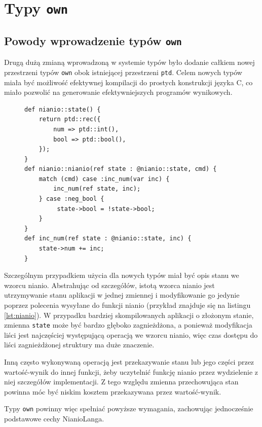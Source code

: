 \documentclass[licencjacka]{pracamgr}
\begin{document}
\section{Typy \texttt{own}}
\subsection{Powody wprowadzenie typów \texttt{own}}
Drugą dużą zmianą wprowadzoną w systemie typów było dodanie całkiem nowej przestrzeni typów \texttt{own} obok
istniejącej przestrzeni \texttt{ptd}. Celem nowych typów miała być możliwość efektywnej kompilacji do
prostych konstrukcji języka C, co miało pozwolić na generowanie efektywniejszych programów wynikowych. 

\begin{figure}
\begin{lstlisting}[caption={Przykład funkcji nianio},label={lst:nianio},aboveskip=-15pt]
def nianio::state() {
    return ptd::rec({
        num => ptd::int(),
        bool => ptd::bool(),
    });
}
def nianio::nianio(ref state : @nianio::state, cmd) {
    match (cmd) case :inc_num(var inc) {
        inc_num(ref state, inc);
    } case :neg_bool {
         state->bool = !state->bool;
    }
}
def inc_num(ref state : @nianio::state, inc) {
    state->num += inc;
}
\end{lstlisting}
\end{figure}
Szczególnym przypadkiem użycia dla nowych typów miał być opis stanu we wzorcu nianio.
Abstrahując od szczegółów, istotą wzorca nianio jest utrzymywanie stanu aplikacji w jednej zmiennej
i modyfikowanie go jedynie poprzez polecenia wysyłane do funkcji nianio (przykład znajduje się
na listingu \ref{lst:nianio}). W przypadku bardziej skompilowanych aplikacji o złożonym stanie,
zmienna \texttt{state} może być bardzo głęboko zagnieżdżona, a ponieważ modyfikacja liści jest najczęściej
występującą operacją we wzorcu nianio, więc czas dostępu do liści zagnieżdżonej
struktury ma duże znaczenie.

Inną często wykonywaną operacją jest przekazywanie stanu lub jego części przez wartość-wynik do innej funkcji,
żeby uczytelnić funkcję nianio przez wydzielenie z niej szczegółów implementacji. Z tego względu zmienna
przechowująca stan powinna móc być niskim kosztem przekazywana przez wartość-wynik. 

Typy \texttt{own} powinny więc spełniać powyższe wymagania, zachowując jednocześnie podstawowe cechy NianioLanga.
\end{document}
